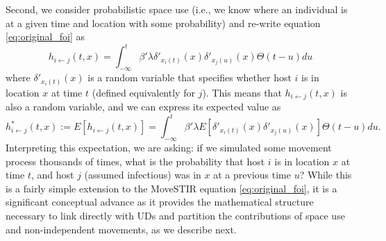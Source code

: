\documentclass[letterpaper]{article}
\begin{document}
Second, we consider probabilistic space use (i.e., we know where an individual is at a given time and location with some probability) and re-write equation \ref{eq:original_foi} as
\begin{equation}
    h_{i \leftarrow j}(t, x) = \int_{-\infty}^{t} \beta' \lambda \delta'_{x_i(t)}(x) \delta'_{x_j(u)}(x) \Theta(t - u) du
    \label{eq:prob_foi}
\end{equation}
where $\delta'_{x_i(t)}(x)$ is a random variable that specifies whether host $i$ is in location $x$ at time $t$ (defined equivalently for $j$).  This means that $h_{i \leftarrow j}(t, x)$ is also a random variable, and we can express its expected value as 
\begin{equation}
    h^*_{i \leftarrow j}(t, x) := E[h_{i \leftarrow j}(t, x)] = \int_{-\infty}^{t} \beta' \lambda E[\delta'_{x_i(t)}(x) \delta'_{x_j(u)}(x)] \Theta(t - u) du.
    \label{eq:expected_foi}
\end{equation}
Interpreting this expectation, we are asking: if we simulated some movement process thousands of times, what is the probability that host $i$ is in location $x$ at time $t$, and host $j$ (assumed infectious) was in $x$ at a previous time $u$?  While this is a fairly simple extension to the MoveSTIR equation \ref{eq:original_foi}, it is a significant conceptual advance as it provides the mathematical structure necessary to link directly with UDs and partition the contributions of space use and non-independent movements, as we describe next.
\end{document}
